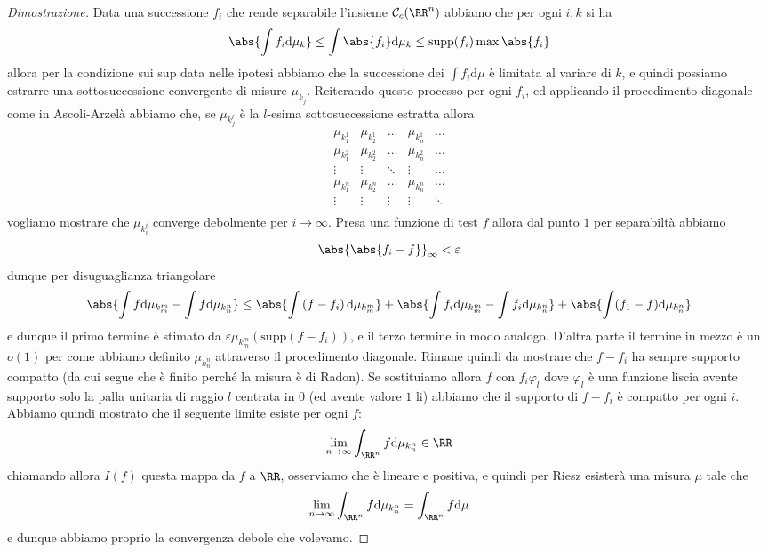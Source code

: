 \documentclass[11pt]{scrartcl}
\newcommand{\dif}{\text{d}}
\begin{document}
	\begin{proof}[Dimostrazione]
		Data una successione $f_i$ che rende separabile l'insieme $\mathcal{C}_c(\RR^n)$ abbiamo che per ogni $i,k$ si ha
		$$\abs{\int f_i\dif \mu_k}\le \int\abs{f_i}\dif \mu_k \le \text{supp}(f_i)\max\abs{f_i}$$
		allora per la condizione sui sup data nelle ipotesi abbiamo che la successione dei $\int f_i\dif \mu$ è limitata al variare di $k$, e quindi possiamo estrarre una sottosuccessione convergente di misure $\mu_{k_j}$. Reiterando questo processo per ogni $f_i$, ed applicando il procedimento diagonale come in Ascoli-Arzelà abbiamo che, se $\mu_{k^l_j}$ è la $l$-esima sottosuccessione estratta allora
		$$
		\begin{array}{ccccc}
			\mu_{k^1_1} & \mu_{k^1_2} & \dots & \mu_{k^1_n} & \dots \\
			\mu_{k^2_1} & \mu_{k^2_2} & \dots & \mu_{k^2_n} & \dots \\
			\vdots & \vdots & \ddots & \vdots & \dots \\
			\mu_{k^n_1} & \mu_{k^n_2} & \dots & \mu_{k^n_n} & \dots \\
			\vdots & \vdots & \vdots & \vdots & \ddots \\
		\end{array}
		$$
		vogliamo mostrare che $\mu_{k_i^i}$ converge debolmente per $i\to\infty$. Presa una funzione di test $f$ allora dal punto $1$ per separabiltà abbiamo
		$$\abs{\abs{f_i-f}}_\infty<\varepsilon$$
		dunque per disuguaglianza triangolare
		$$\abs{\int f \dif \mu_{k_m^m}-\int f \dif \mu_{k_n^n}}\le \abs{\int\left(f-f_i\right)\dif \mu_{k_m^m}}+\abs{\int f_i \dif \mu_{k_m^m}-\int f_i \dif \mu_{k_n^n}}+\abs{\int(f_1-f)\dif\mu_{k_n^n} }$$ 
		e dunque il primo termine è stimato da $\varepsilon \mu_{k_m^m}(\text{supp}(f-f_i))$, e il terzo termine in modo analogo. D'altra parte il termine in mezzo è un $o(1)$ per come abbiamo definito $\mu_{k^n_n}$ attraverso il procedimento diagonale. Rimane quindi da mostrare che $f-f_i$ ha sempre supporto compatto (da cui segue che è finito perché la misura è di Radon).
		Se sostituiamo allora $f$ con 
		$f_i\varphi_l$
		dove $\varphi_l$ è una funzione liscia avente supporto solo la palla unitaria di raggio $l$ centrata in $0$ (ed avente valore $1$ lì) abbiamo che il supporto di $f-f_i$ è compatto per ogni $i$. \\ Abbiamo quindi mostrato che il seguente limite esiste per ogni $f$:
		$$\lim_{n\to\infty}\int_{\RR^n} f \dif \mu_{k^n_n}\in\RR$$
		chiamando allora $I(f)$ questa mappa da $f$ a $\RR$, osserviamo che è lineare e positiva, e quindi per Riesz esisterà una misura $\mu$ tale che
		$$\lim_{n\to\infty}\int_{\RR^n} f \dif \mu_{k^n_n}=\int_{\RR^n}f\dif \mu$$
		e dunque abbiamo proprio la convergenza debole che volevamo.
	\end{proof}
\end{document}
